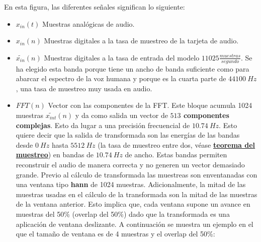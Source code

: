 En esta figura, las diferentes señales significan lo siguiente:
\begin{itemize}
	\item $x_{in}(t)$ Muestras analógicas de audio.
	\item $x_{in}(n)$ Muestras digitales a la tasa de muestreo de la tarjeta de audio.
 	\item $\widetilde{x_{in}}(n)$ Muestras digitales a la tasa de entrada del modelo $11025\frac{muestras}{segundo}$. Se ha elegido esta banda porque tiene un ancho de banda suficiente como para abarcar el espectro de la voz humana y porque es la cuarta parte de $44100~Hz$, una tasa de muestreo muy usada en audio.
 	\item $FFT(n)$ Vector con las componentes de la \gls{FFT}. Este bloque acumula 1024 muestras $\widetilde{x_{int}}(n)$ y da como salida un vector de \textbf{$513$ componentes complejas}. Esto da lugar a una precisión frecuencial de $10.74~Hz$. Esto quiere decir que la salida de transformada son las energías de las bandas desde $0~Hz$ hasta $5512~Hz$ (la tasa de muestreo entre dos, véase \hyperref[subsec: nyquist]{\textbf{teorema del muestreo}}) en bandas de $10.74~Hz$ de ancho. Estas bandas permiten reconstruir el audio de manera correcta y no generen un vector demasiado grande. Previo al cálculo de transformada las muestreas son enventanadas con una ventana tipo \textbf{hann} de 1024 muestras. Adicionalmente, la mitad de las muestras usadas en el cálculo de la transformada son la mitad de las muestras de la ventana anterior. Esto implica que, cada ventana supone un avance en muestras del 50\% (overlap del 50\%) dado que la transformada es una aplicación de ventana deslizante. A continuación se muestra un ejemplo en el que el tamaño de ventana es de 4 muestras y el overlap del 50\%:
 	\enlargethispage{0.5in}
 	\begin{center}
	 	\vspace*{5pt}
\end{center}
\end{itemize}
